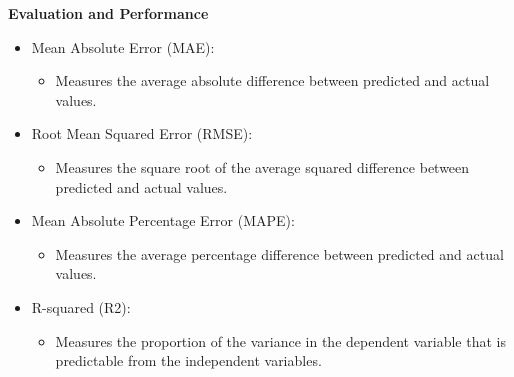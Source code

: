 \begin{frame}
	
	\textbf{Evaluation and Performance}
	\begin{itemize}
		\item Mean Absolute Error (MAE):
		\begin{itemize}
			\item Measures the average absolute difference between predicted and actual values.
		\end{itemize}
		
		\item Root Mean Squared Error (RMSE):
		\begin{itemize}
			\item Measures the square root of the average squared difference between predicted and actual values.
		\end{itemize}
		
		\item Mean Absolute Percentage Error (MAPE):
		\begin{itemize}
			\item Measures the average percentage difference between predicted and actual values.
		\end{itemize}
		
		\item R-squared (R2):
		\begin{itemize}
			\item Measures the proportion of the variance in the dependent variable that is predictable from the independent variables.
		\end{itemize}
	\end{itemize}
\end{frame}




